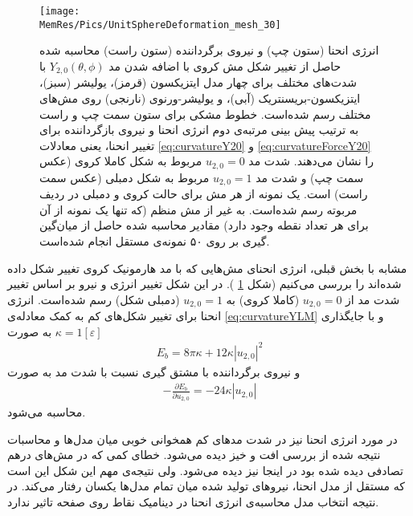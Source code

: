 \begin{figure}[tbhp]
\begin{center}
\texttt{[image: \\MemRes/Pics/UnitSphereDeformation\_mesh\_30]}
\caption{
انرژی انحنا (ستون چپ) و نیروی برگرداننده (ستون راست) محاسبه‌ شده حاصل از تغییر شکل مش کروی با اضافه شدن مد
$Y_{2,0}(\theta,\phi)$
با شدت‌های مختلف برای چهار مدل ایتزیکسون (قرمز)، یولیشر (سبز)، ایتزیکسون-بریسنتریک (آبی)، و یولیشر-ورنوی (نارنجی) روی مش‌های مختلف رسم شده‌است. خطوط مشکی برای ستون سمت چپ و راست به ترتیب پیش بینی
 مرتبه‌ی دوم انرژی انحنا و نیروی بازگرداننده برای تغییر انحنا، یعنی معادلات
\ref{eq:curvatureY20}
و
\ref{eq:curvatureForceY20}
را نشان می‌دهند.  شدت مد 
$u_{2,0}=0$
مربوط به شکل کاملا کروی (عکس سمت چپ) و شدت مد 
$u_{2,0}=1$
مربوط به شکل دمبلی (عکس سمت راست) است. یک نمونه از هر مش برای حالت کروی و دمبلی در ردیف مربوته رسم شده‌است. به غیر از مش منظم (که تنها یک نمونه از آن برای هر تعداد نقطه وجود دارد) مقادیر محاسبه شده حاصل از میان‌گین گیری بر روی ۵۰ نمونه‌ی مستقل انجام شده‌است.
}
\label{fig:unitsphereBendingULM20}
\end{center}
\end{figure}

مشابه با بخش قبلی، انرژی انحنای مش‌هایی که با مد هارمونیک کروی تغییر شکل داده شده‌اند را بررسی می‌کنیم (شکل
\ref{fig:unitsphereBendingULM20}
). در این شکل تغییر انرژی و نیرو بر اساس تغییر شدت مد از
$u_{2,0}=0$
(کاملا کروی) به
$u_{2,0}=1$
(دمبلی شکل) رسم شده‌است. انرژی انحنا برای تغییر شکل‌های کم به کمک معادله‌ی 
\ref{eq:curvatureYLM}
 و با جایگذاری 
 $\kappa=1[\varepsilon]$
 به صورت
\begin{eqnarray}
E_{b}=8\pi\kappa + 12\kappa|u_{2,0}|^2
\label{eq:curvatureY20}
\end{eqnarray}
و نیروی برگرداننده با مشتق گیری نسبت با شدت مد به صورت
\begin{eqnarray}
-\frac{\partial E_{b}}{\partial u_{2,0}}= -24\kappa |u_{2,0}|
\label{eq:curvatureForceY20}
\end{eqnarray}
محاسبه می‌شود.

در مورد انرژی انحنا نیز در شد‌ت مدهای کم همخوانی خوبی میان مدل‌ها و محاسبات نتیجه شده از بررسی افت و خیز دیده می‌شود. خطای کمی که در مش‌های درهم تصادفی دیده‌ شده بود در اینجا نیز دیده می‌شود. ولی نتیجه‌ی مهم این شکل این است که مستقل از مدل انحنا، نیروهای تولید شده میان تمام مدل‌ها یکسان رفتار می‌کند. در نتیجه انتخاب مدل محاسبه‌ی انرژی انحنا در دینامیک نقاط روی صفحه تاثیر ندارد.

